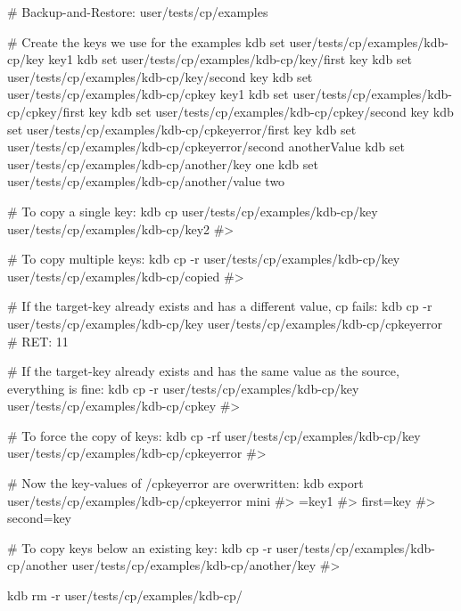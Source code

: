 \begin{DoxyCode}
# Backup-and-Restore: user/tests/cp/examples

# Create the keys we use for the examples
kdb set user/tests/cp/examples/kdb-cp/key key1
kdb set user/tests/cp/examples/kdb-cp/key/first key
kdb set user/tests/cp/examples/kdb-cp/key/second key
kdb set user/tests/cp/examples/kdb-cp/cpkey key1
kdb set user/tests/cp/examples/kdb-cp/cpkey/first key
kdb set user/tests/cp/examples/kdb-cp/cpkey/second key
kdb set user/tests/cp/examples/kdb-cp/cpkeyerror/first key
kdb set user/tests/cp/examples/kdb-cp/cpkeyerror/second anotherValue
kdb set user/tests/cp/examples/kdb-cp/another/key one
kdb set user/tests/cp/examples/kdb-cp/another/value two

# To copy a single key:
kdb cp user/tests/cp/examples/kdb-cp/key user/tests/cp/examples/kdb-cp/key2
#>

# To copy multiple keys:
kdb cp -r user/tests/cp/examples/kdb-cp/key user/tests/cp/examples/kdb-cp/copied
#>

# If the target-key already exists and has a different value, cp fails:
kdb cp -r user/tests/cp/examples/kdb-cp/key user/tests/cp/examples/kdb-cp/cpkeyerror
# RET: 11

# If the target-key already exists and has the same value as the source, everything is fine:
kdb cp -r user/tests/cp/examples/kdb-cp/key user/tests/cp/examples/kdb-cp/cpkey
#>

# To force the copy of keys:
kdb cp -rf user/tests/cp/examples/kdb-cp/key user/tests/cp/examples/kdb-cp/cpkeyerror
#>

# Now the key-values of /cpkeyerror are overwritten:
kdb export user/tests/cp/examples/kdb-cp/cpkeyerror mini
#> =key1
#> first=key
#> second=key

# To copy keys below an existing key:
kdb cp -r user/tests/cp/examples/kdb-cp/another user/tests/cp/examples/kdb-cp/another/key
#>

kdb rm -r user/tests/cp/examples/kdb-cp/
\end{DoxyCode}
 